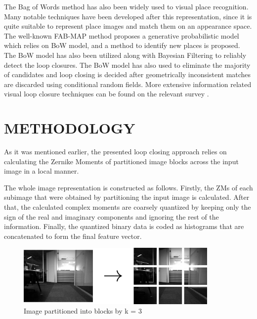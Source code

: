 \documentclass[]{spie}  %
\begin{document}
The Bag of Words\cite{1238663} method has also been widely used to visual place recognition. Many notable techniques have been developed after this representation, since it is quite suitable to represent place images and match them on an appearance space. The well-known FAB-MAP method proposes a generative probabilistic model\cite{CumminsNewmanIJRR08} which relies on BoW model, and a method to identify new places is proposed. The BoW model has also been utilized along with Bayesian Filtering\cite{4633680} to reliably detect the loop closures. The BoW model has also used to eliminate the majority of candidates\cite{5650234} and loop closing is decided after geometrically inconsistent matches are discarded using conditional random fields. More extensive information related visual loop closure techniques can be found on the relevant survey \cite{williams09}.


\section{METHODOLOGY}

As it was mentioned earlier, the presented loop closing approach relies on calculating the Zernike Moments of partitioned image blocks across the input image in a local manner. 

The whole image representation is constructed as follows. Firstly, the ZMs of each subimage that were obtained by partitioning the input image is calculated. After that, the calculated complex moments are coarsely quantized by keeping only the sign of the real and imaginary components and ignoring the rest of the information. Finally, the quantized binary data is coded as histograms that are concatenated to form the final feature vector.

\begin{figure}[!htb]
        \centering
        \includegraphics[trim = 0mm 0mm 0mm 0mm, clip, height=3cm]{figures/divided_image.png}    
        \vspace{3mm}
        \caption{Image partitioned into blocks by k = 3}
        \label{fig:divided_image}
\end{figure}
\end{document}

